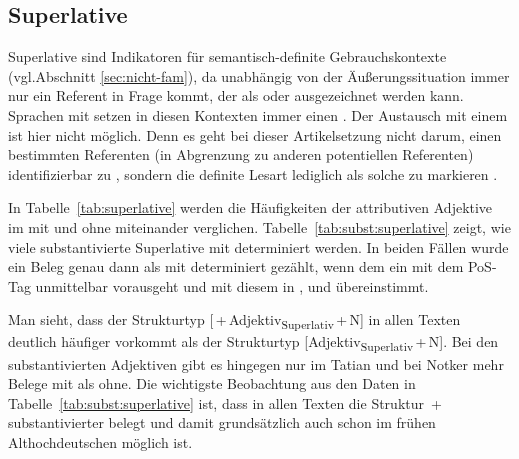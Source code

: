 \subsection{Superlative}\label{sec:ergeb-superaltiv}

Superlative  sind Indikatoren für semantisch-definite  Gebrauchskontexte  (vgl.\linebreak Abschnitt \ref{sec:nicht-fam}), da unabhängig von der Äußerungssituation  immer nur ein Referent in Frage kommt, der als  oder  ausgezeichnet werden kann. Sprachen mit  setzen in diesen Kontexten immer einen  \parencite{Himmelmann2001}. Der Austausch mit einem  ist hier nicht möglich. Denn es geht bei dieser Artikelsetzung nicht darum, einen bestimmten Referenten (in Abgrenzung zu anderen potentiellen Referenten) identifizierbar zu , sondern die definite Lesart lediglich als solche zu markieren \parencite[41]{Himmelmann1997}.

In Tabelle~\ref{tab:superlative} werden die Häufigkeiten der attributiven Adjektive  im  mit und ohne  miteinander verglichen. Tabelle~\ref{tab:subst:superlative} zeigt, wie viele substantivierte  Superlative  mit  determiniert werden. In beiden Fällen wurde ein Beleg genau dann als mit  determiniert gezählt, wenn dem  ein  mit dem PoS-Tag  unmittelbar vorausgeht und mit diesem in ,  und  übereinstimmt. 

Man sieht, dass der Strukturtyp [\,+\,Adjektiv\textsubscript{Superlativ}\,+\,N] in allen Texten deutlich häufiger vorkommt als der Strukturtyp [Adjektiv\textsubscript{Superlativ}\,+\,N]. Bei den substantivierten Adjektiven gibt es hingegen nur im Tatian und bei Notker mehr Belege mit  als ohne. Die wichtigste Beobachtung aus den Daten in Tabelle~\ref{tab:subst:superlative} ist, dass in allen Texten die Struktur \,+\,substantivierter   belegt und damit grundsätzlich auch schon im frühen Althochdeutschen möglich ist. 

 
